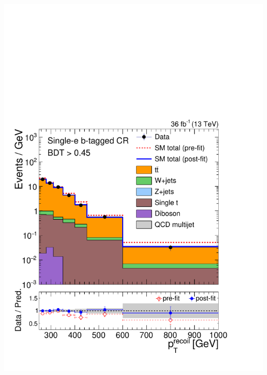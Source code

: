\documentclass[aspectratio=169,xcolor=dvipsnames,,table,compress]{beamer}
\begin{document}
\begin{frame}[t]
\begin{columns}[T]
\begin{column}{0.125\textwidth}
      \includegraphics[width=\textwidth]{../figures/monotop/postfit/stackedPostfit_singleelectrontop_monotop.pdf}\\ 

\end{column}
\end{columns}
\end{frame}
\end{document}
